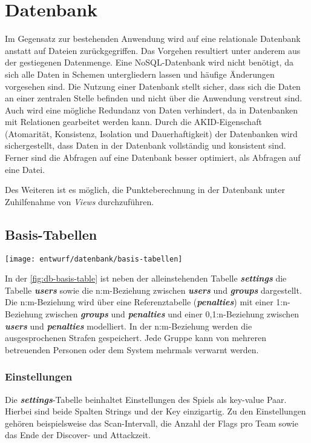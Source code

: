 \section{Datenbank}
\label{sec:Entwurf-Datenbank}
Im Gegensatz zur bestehenden Anwendung wird auf eine relationale Datenbank anstatt auf Dateien zurückgegriffen. Das Vorgehen resultiert unter anderem aus der gestiegenen Datenmenge. Eine NoSQL-Datenbank wird nicht benötigt, da sich alle Daten in Schemen untergliedern lassen und häufige Änderungen vorgesehen sind. Die Nutzung einer Datenbank stellt sicher, dass sich die Daten an einer zentralen Stelle befinden und nicht über die Anwendung verstreut sind. Auch wird eine mögliche Redundanz von Daten verhindert, da in Datenbanken mit Relationen gearbeitet werden kann. Durch die AKID-Eigenschaft (Atomarität, Konsistenz, Isolation und Dauerhaftigkeit) der Datenbanken wird sichergestellt, dass Daten in der Datenbank vollständig und konsistent sind. Ferner sind die Abfragen auf eine Datenbank besser optimiert, als Abfragen auf eine Datei. \cite{drillingWasIstDatenbank2017}

Des Weiteren ist es möglich, die Punkteberechnung in der Datenbank unter Zuhilfenahme von \textit{Views} durchzuführen.

\subsection{Basis-Tabellen}
\begin{center}
	\texttt{[image: entwurf/datenbank/basis-tabellen]}
	\label{fig:db-basis-table}
\end{center}

In der \autoref{fig:db-basis-table} ist neben der alleinstehenden Tabelle \textbf{\textit{settings}} die Tabelle \textbf{\textit{users}} sowie die n:m-Beziehung  zwischen \textbf{\textit{users}} und \textbf{\textit{groups}} dargestellt. Die  n:m-Beziehung wird über eine Referenztabelle (\textbf{\textit{penalties}}) mit einer 1:n-Beziehung zwischen \textbf{\textit{groups}} und \textbf{\textit{penalties}} und einer 0,1:n-Beziehung zwischen \textbf{\textit{users}} und \textbf{\textit{penalties}} modelliert. In der n:m-Beziehung werden die ausgesprochenen Strafen gespeichert. Jede Gruppe kann von mehreren betreuenden Personen oder dem System mehrmals verwarnt werden.

\subsubsection{Einstellungen}
Die \textbf{\textit{settings}}-Tabelle beinhaltet Einstellungen des Spiels als key-value Paar. Hierbei sind beide Spalten Strings und der Key einzigartig. Zu den Einstellungen gehören beispielsweise das Scan-Intervall, die Anzahl der Flags pro Team sowie das Ende der Discover- und Attackzeit.

